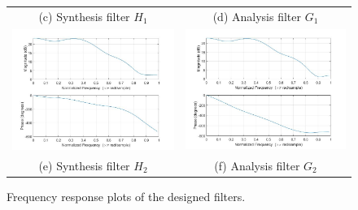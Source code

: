 \begin{figure}[htpb]
\begin{tabular}{cc}
(c) Synthesis filter $H_1$  & (d) Analysis filter $G_1$  \\
\includegraphics[trim={0 9cm 0 0}, clip,width=75mm]{H2.jpg} & \includegraphics[trim={0 9cm 0 0}, clip,width=75mm]{G2.jpg} \\
(e) Synthesis filter $H_2$ & (f) Analysis filter $G_2$\\[6pt]
\end{tabular}
\caption{Frequency response plots of the designed filters.}
\label{freq_resp}
\end{figure}

